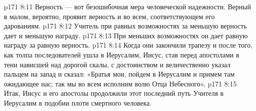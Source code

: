 \vs p171 8:11 \pc {}\bibnobreakspace Верность --- вот безошибочная мера человеческой надежности. Верный в малом, вероятно, проявит верность и во всем, соответствующем его дарованиям.
\vs p171 8:12 \pc {}\bibnobreakspace Учитель при равных возможностях за меньшую верность дает и меньшую награду.
\vs p171 8:13 \pc {}\bibnobreakspace При меньших возможностях он дает равную награду за равную верность.
\vs p171 8:14 \pc Когда они закончили трапезу и после того, как толпа последователей ушла в Иерусалим, Иисус, став перед апостолами в тени нависшей над дорогой скалы, с достоинством и величественно указал пальцем на запад и сказал: «Братья мои, пойдем в Иерусалим и примем там ожидающее нас; так мы во всем исполним волю Отца Небесного».
\vs p171 8:15 Итак, Иисус и его апостолы продолжили этот последний путь Учителя в Иерусалим в подобии плоти смертного человека.

